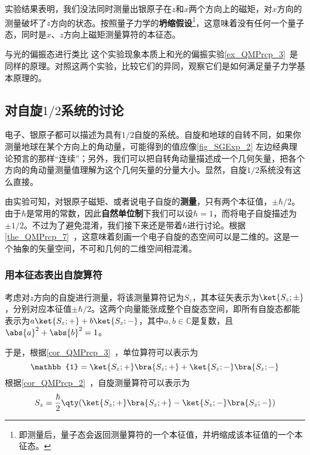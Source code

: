 实验结果表明，我们没法同时测量出银原子在$z$和$x$两个方向上的磁矩，对$x$方向的测量破坏了$z$方向的状态。按照量子力学的\textbf{坍缩假设}\footnote{即测量后，量子态会返回测量算符的一个本征值，并坍缩成该本征值的一个本征态。}，这意味着没有任何一个量子态，同时是$x$、$z$方向上磁矩测量算符的本征态。



\begin{exercise}{与光的偏振态进行类比}
这个实验现象本质上和光的偏振实验\autoref{ex_QMPrcp_3}~是同样的原理。对照这两个实验，比较它们的异同，观察它们是如何满足量子力学基本原理的。
\end{exercise}






\subsection{对自旋$1/2$系统的讨论}

电子、银原子都可以描述为具有$1/2$自旋的系统。自旋和地球的自转不同，如果你测量地球在某个方向上的角动量，可能得到的值应像\autoref{fig_SGExp_2} 左边经典理论预言的那样“连续”；另外，我们可以把自转角动量描述成一个几何矢量，把各个方向的角动量测量值理解为这个几何矢量的分量大小。显然，自旋$1/2$系统没有这么直接。

由实验可知，对银原子磁矩、或者说电子自旋的\textbf{测量}，只有两个本征值，$\pm\hbar/2$。由于$\hbar$是常用的常数，因此\textbf{自然单位制}下我们可以设$\hbar=1$，而将电子自旋描述为$\pm 1/2$。不过为了避免混淆，我们接下来还是带着$\hbar$进行讨论。根据\autoref{the_QMPrcp_7}~，这意味着刻画一个电子自旋的态空间可以是二维的。这是一个抽象的矢量空间，不可和几何的二维空间相混淆。

\subsubsection{用本征态表出自旋算符}

考虑对$z$方向的自旋进行测量，将该测量算符记为$S_z$，其本征矢表示为$\ket{S_z; \pm}$，分别对应本征值$\pm \hbar/2$。这两个向量能张成整个自旋态空间，即所有自旋态都能表示为$a\ket{S_z; +}+b\ket{S_z; -}$，其中$a, b\in\mathbb{C}$是复数，且$\abs{a}^2+\abs{b}^2=1$。

于是，根据\autoref{cor_QMPrcp_3}~，单位算符可以表示为
\begin{equation}
\mathbb{1}=\ket{S_z; +}\bra{S_z; +} + \ket{S_z; -}\bra{S_z; -}
\end{equation}
根据\autoref{cor_QMPrcp_2}~，自旋测量算符可以表示为
\begin{equation}
S_z=\frac{\hbar}{2}\qty(\ket{S_z; +}\bra{S_z; +} - \ket{S_z; -}\bra{S_z; -})
\end{equation}

